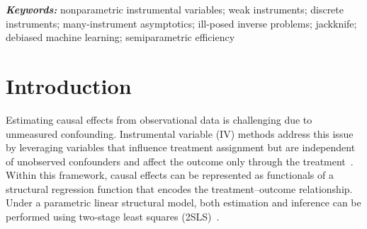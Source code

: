 \documentclass[11pt]{article}
\theoremstyle{plain}
\theoremstyle{definition}
\theoremstyle{remark}
\theoremstyle{definition}
\providecommand{\keywords}[1]
{
  \small	
  \textbf{\textit{Keywords:}} #1
}
\newcommand{\slightspacing}{\setstretch{1.175}}
\begin{document}
\begin{abstract}
\end{abstract}


\slightspacing
 
\keywords{nonparametric instrumental variables; weak instruments; discrete instruments; many-instrument asymptotics; ill-posed inverse problems; jackknife; debiased machine learning; semiparametric efficiency}

\section{Introduction}

 
Estimating causal effects from observational data is challenging due to unmeasured confounding. Instrumental variable (IV) methods address this issue by leveraging variables that influence treatment assignment but are independent of unobserved confounders and affect the outcome only through the treatment~\citep{wald1940fitting, reiersol1941confluence, angrist1996identification}. Within this framework, causal effects can be represented as functionals of a structural regression function that encodes the treatment--outcome relationship. Under a parametric linear structural model, both estimation and inference can be performed using two-stage least squares (2SLS)~\citep{basmann1957generalized, sargan1958estimation, wooldridge2010econometric}.
\end{document}
